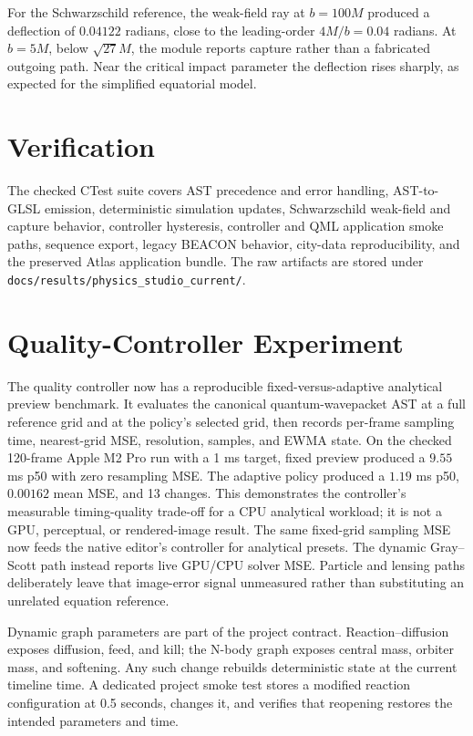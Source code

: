 \documentclass[10pt]{article}
\begin{document}
For the Schwarzschild reference, the weak-field ray at $b=100M$ produced a deflection of
$0.04122$ radians, close to the leading-order $4M/b=0.04$ radians. At $b=5M$, below
$\sqrt{27}M$, the module reports capture rather than a fabricated outgoing path. Near the critical
impact parameter the deflection rises sharply, as expected for the simplified equatorial model.

\section{Verification}

The checked CTest suite covers AST precedence and error handling, AST-to-GLSL emission, deterministic
simulation updates, Schwarzschild weak-field and capture behavior, controller hysteresis, controller
and QML application smoke paths, sequence export, legacy BEACON behavior, city-data reproducibility,
and the preserved Atlas application bundle. The raw artifacts are stored under
\texttt{docs/results/physics\_studio\_current/}.

\section{Quality-Controller Experiment}

The quality controller now has a reproducible fixed-versus-adaptive analytical preview benchmark.
It evaluates the canonical quantum-wavepacket AST at a full reference grid and at the policy's
selected grid, then records per-frame sampling time, nearest-grid MSE, resolution, samples, and
EWMA state. On the checked 120-frame Apple M2 Pro run with a 1 ms target, fixed preview produced a
$9.55$ ms p50 with zero resampling MSE. The adaptive policy produced a $1.19$ ms p50,
$0.00162$ mean MSE, and 13 changes. This demonstrates the controller's measurable timing-quality
trade-off for a CPU analytical workload; it is not a GPU, perceptual, or rendered-image result.
The same fixed-grid sampling MSE now feeds the native editor's controller for analytical presets.
The dynamic Gray--Scott path instead reports live GPU/CPU solver MSE. Particle and lensing paths
deliberately leave that image-error signal unmeasured rather than substituting an unrelated equation
reference.

Dynamic graph parameters are part of the project contract. Reaction--diffusion exposes diffusion,
feed, and kill; the N-body graph exposes central mass, orbiter mass, and softening. Any such change
rebuilds deterministic state at the current timeline time. A dedicated project smoke test stores a
modified reaction configuration at 0.5 seconds, changes it, and verifies that reopening restores
the intended parameters and time.
\end{document}
